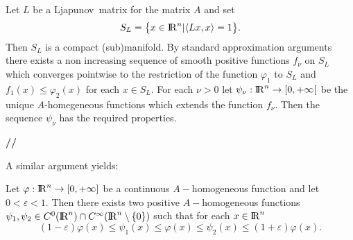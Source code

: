 \documentclass[12pt,a4paper]{amsart}
\begin{document}
{{\removelastskip\par\medskip\goodbreak{}}
Let ${L}$ be a {Ljapunov}\ matrix for the matrix ${A}$ and set
\begin{equation}\nonumber
	{S_{L}}=\bigl\{{x}\in{{\rm I\kern-.185em R}}^{n}
	\vert{\left<{{L}{x}},{{x}}\right>}=1\bigr\}.
\end{equation}
Then ${S_{L}}$ is a compact (sub)manifold.
By standard approximation arguments there exists a non increasing sequence of smooth
positive functions $f_{\nu}$ on ${S_{L}}$ which converges pointwise
to the restriction of the function ${\varphi}_{1}$ to ${S_{L}}$
and $f_1({x})\leq{\varphi}_2({x})$
for each ${x}\in{S_{L}}$.
For each ${\nu}>0$ let ${\psi}_{\nu}:{{\rm I\kern-.185em R}}^{n}\to[0,+\infty[$
be the unique ${A}$-homegeneous functions which extends the function $f_{\nu}$.
Then the sequence ${\psi}_{\nu}$ has the required properties.

{{\bf //}\par\smallskip}

A similar argument yields:

\begin{proposition}\label{thm::HomogeneousApproximationTwo}
Let ${\varphi}:{{\rm I\kern-.185em R}}^{n}\to[0,+\infty]$ be
a continuous ${A}-$homogeneous function
and let $0<{\varepsilon}<1$.
Then there exists two positive ${A}-$homogeneous functions
${\psi}_1,{\psi}_2\in C^0({{\rm I\kern-.185em R}}^{n})\cap C^\infty({{\rm I\kern-.185em R}}^{n}\setminus\{0\})$
such that
for each ${x}\in{{\rm I\kern-.185em R}}^{n}$
\begin{equation}\nonumber
(1-{\varepsilon}){\varphi}({x})
\leq{\psi}_1({x})
\leq{\varphi}({x})
\leq{\psi}_2({x})
\leq(1+{\varepsilon}){\varphi}({x}).
\end{equation}
\end{proposition}

} 
\end{document}

